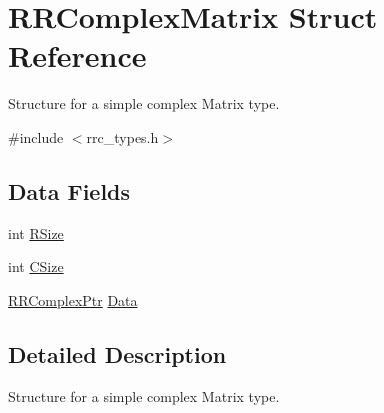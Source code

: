 \hypertarget{struct_r_r_complex_matrix}{\section{R\-R\-Complex\-Matrix Struct Reference}
\label{struct_r_r_complex_matrix}
}


Structure for a simple complex Matrix type.  




{\ttfamily \#include $<$rrc\-\_\-types.\-h$>$}

\subsection*{Data Fields}
\begin{DoxyCompactItemize}
\item 
int \hyperlink{struct_r_r_complex_matrix_a4d8512c879223c0e0d1522dae38e7819}{R\-Size}
\item 
int \hyperlink{struct_r_r_complex_matrix_a17c9a5894aa9cb3789346dcaa9c370bb}{C\-Size}
\item 
\hyperlink{rrc__types_8h_ada2046d7326c56ae29d8510fbf6622ee}{R\-R\-Complex\-Ptr} \hyperlink{struct_r_r_complex_matrix_a2853286fc6b37960bba4c8871da839fa}{Data}
\end{DoxyCompactItemize}


\subsection{Detailed Description}
Structure for a simple complex Matrix type. 

